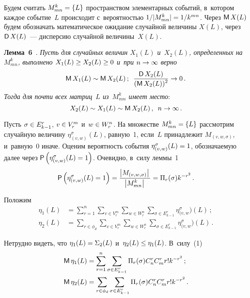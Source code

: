\begin{multicols}{2}
\smallskip

    Будем считать $M^k_{mn}\hm=\{L\}$ пространством элементарных 
событий, в~котором каждое событие~$L$ происходит с~вероятностью $1/\vert 
M^k_{mn}\vert \hm= 1/k^{mn}$. Через ${\sf M}\,X(L)$ будем обозначать 
математическое ожидание случайной величины $X(L)$, через ${\sf D}\,X(L)$~--- дисперсию случайной величины~$X(L)$.
    
    \smallskip
    
    \noindent
    \textbf{Лемма~6}~\cite{6-duk}. \textit{Пусть для случайных величин 
$X_1(L)$ и~$X_2(L)$, определенных на~$M^k_{mn}$, выполнено 
$X_1(L)\hm\geq X_2(L)\hm\geq 0$ и~при $n\hm\to\infty$ верно}
    $$
    {\sf M}\,X_1(L)\sim {\sf M}\,X_2(L)\,;\enskip
    \displaystyle\frac{\displaystyle {\sf D}\,X_2(L)\mathstrut}{\displaystyle ({\sf M}\,X_2(L))^2\mathstrut}\to 0\,.
    $$
    \textit{Тогда для почти всех матриц~$L$ из~$M^k_{mn}$ имеет место}: 
    $$
    X_2(L)\sim X_1(L) \sim {\sf M}\,X_2(L)\,,\enskip n\to \infty\,.
    $$
    
    Пусть $\sigma \hm\in E^r_{k-1}$, $v\hm\in V_r^m$ и~$w\hm\in W_r^n$. На 
множестве $M^k_{mn}\hm= \{L\}$ рассмотрим случайную величину 
$\eta^\sigma_{(v,w)}(L)$, равную~1, если~$L$ принадлежит 
$M_{(v,w,\sigma)}$, и~равную~0 иначе. Оценим вероятность события 
$\eta^\sigma_{(v,w)}(L)\hm=1$, обозначаемую далее через ${\sf P}\left( 
\eta^\sigma_{(v,w)}(L)\hm=1\right)$. Очевидно, в~силу леммы~1
    \begin{equation}
    {\sf P}\left( \eta^\sigma_{(v,w)} (L)=1\right) =\displaystyle\frac{\displaystyle \left\vert 
M_{(v,w,\sigma)}\right\vert\mathstrut}{\displaystyle \left\vert M^k_{mn}\right\vert\mathstrut} =\Pi_r(\sigma) k^{-
r^2}\,.
    \label{e1-duk}
    \end{equation} 
    
    Положим
    \begin{align*}
    \eta_1(L) &= \sum\limits^n_{r=1} \sum\limits_{v\in V_r^m} \sum\limits_{w\in 
W_r^n} \sum\limits_{\sigma\in E^r_{k-1}} \eta^\sigma_{(v,w}) (L)\,;\\
    \eta_2(L) &= \sum\limits_{r\in \phi_d} \sum\limits_{v\in V_r^m} 
\sum\limits_{w\in W_r^n} \sum\limits_{\sigma\in E^r_{k-1}} \eta^\sigma_{(v,w}) 
(L)\,.
    \end{align*}
    
    Нетрудно видеть, что $\eta_1(L)\hm= \Sigma_2(L)$ и~$\eta_2(L)\hm \leq 
\eta_1(L)$. В~силу~(1) 
    \begin{align*}
    {\sf M}\,\eta_1(L) &= \sum\limits^n_{r=1} \sum\limits_{\sigma \in E^r_{k-1} }
\Pi_r (\sigma) C_n^r C_m^r r! k^{-r^2}\,;\\
    {\sf M}\,\eta_2(L) &= \sum\limits_{r\in \phi_d} \sum\limits_{\sigma \in 
E^r_{k-1}} \Pi_r (\sigma) C_n^r C_m^r r! k^{-r^2}\,.
    \end{align*}
    

\end{multicols}

